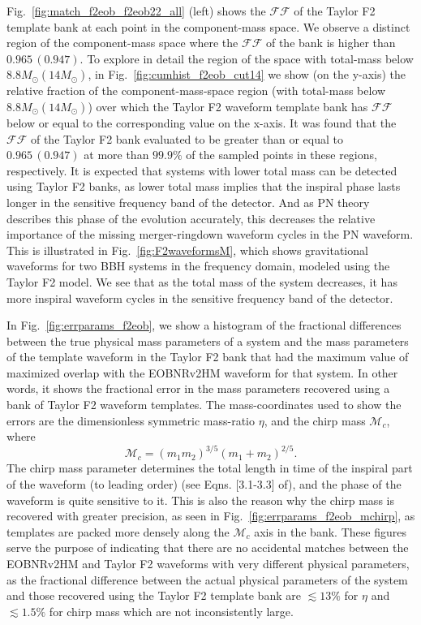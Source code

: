 \documentclass[aps,
prd,
amsmath,
amssymb,
twocolumn,
floatfix,
groupedaddress]{revtex4-1}
\newcommand{\FF}{\mathcal{FF}}
\begin{document}
Fig.~\ref{fig:match_f2eob_f2eob22_all} (left) shows the $\mathcal{FF}$ of the Taylor F2 template bank at each point in the component-mass space. We observe a distinct region of the component-mass space where the $\mathcal{FF}$ of the bank is higher than $0.965\, (0.947)$. To explore in detail the region of the space with total-mass below $8.8M_{\odot} (14M_{\odot})$, in Fig.~\ref{fig:cumhist_f2eob_cut14} we show (on the y-axis) the relative fraction of the component-mass-space region (with total-mass below $8.8M_{\odot} (14M_{\odot})$) over which the Taylor F2 waveform template bank has $\mathcal{FF}$ below or equal to the corresponding value on the x-axis. It was found that the $\FF$ of the Taylor F2 bank evaluated to be greater than or equal to $0.965\, (0.947)$ at more than $99.9\%$ of the sampled points in these regions, respectively. It is expected that systems with lower total mass can be detected using Taylor F2 banks, as lower total mass implies that the inspiral phase lasts longer in the sensitive 
frequency band 
of the detector. And as PN theory describes this phase of the evolution accurately, this decreases the relative importance of the missing merger-ringdown waveform cycles in the PN waveform. This is illustrated in Fig.~\ref{fig:F2waveformsM}, which shows gravitational waveforms for two BBH systems in the frequency domain, modeled using the Taylor F2 model. We see that as the total mass of the system decreases, it has more inspiral waveform cycles in the sensitive frequency band of the detector. 

In Fig.~\ref{fig:errparams_f2eob}, we show a histogram of the fractional differences between the true physical mass parameters of a system and the mass parameters of the template waveform in the Taylor F2 bank that had the maximum value of maximized overlap with the EOBNRv2HM waveform for that system. In other words, it shows the fractional error in the mass parameters recovered using a bank of Taylor F2 waveform templates. The mass-coordinates used to show the errors are the dimensionless symmetric mass-ratio $\eta$, and the chirp mass $\mathcal{M}_c$, where
\begin{equation}
\label{eq:Mchirpdef}
\mathcal{M}_c = (m_1m_2)^{3/5}(m_1+m_2)^{2/5}.
\end{equation}
The chirp mass parameter determines the total length in time of the inspiral part of the waveform (to leading order) \citep{SathyaBankPlacementTauN} (see Eqns. [3.1-3.3] of), and the phase of the waveform is quite sensitive to it. This is also the reason why the chirp mass is recovered with greater precision, as seen in Fig.~\ref{fig:errparams_f2eob_mchirp}, as templates are packed more densely along the $\mathcal{M}_c$ axis in the bank. These figures serve the purpose of indicating that there are no accidental matches between the EOBNRv2HM and Taylor F2 waveforms with very different physical parameters, as the fractional difference between the actual physical parameters of the system and those recovered using the Taylor F2 template bank are $\lesssim 13\%$ for $\eta$ and $\lesssim 1.5\%$ for chirp mass which are not inconsistently large.
\end{document}
